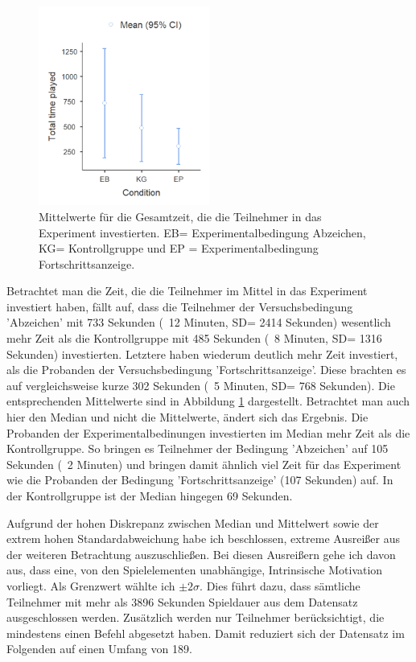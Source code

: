 \begin{figure}[htbp]
    \centering
    \includegraphics[width=0.5\textwidth]{img/auswertung/mean_time.png}
    \caption{Mittelwerte für die Gesamtzeit, die die Teilnehmer in das Experiment investierten. EB= Experimentalbedingung Abzeichen, KG= Kontrollgruppe und EP = Experimentalbedingung Fortschrittsanzeige.}
    \label{mean_time}
\end{figure}
Betrachtet man die Zeit, die die Teilnehmer im Mittel in das Experiment investiert haben, fällt auf, dass die Teilnehmer der Versuchsbedingung 'Abzeichen' mit 733 Sekunden (~12 Minuten, SD= 2414 Sekunden) wesentlich mehr Zeit als die Kontrollgruppe mit 485 Sekunden (~8 Minuten, SD= 1316 Sekunden) investierten. Letztere haben wiederum deutlich mehr Zeit investiert, als die Probanden der Versuchsbedingung 'Fortschrittsanzeige'. Diese brachten es auf vergleichsweise kurze 302 Sekunden (~5 Minuten, SD= 768 Sekunden). Die entsprechenden Mittelwerte sind in Abbildung \ref{mean_time} dargestellt. Betrachtet man auch hier den Median und nicht die Mittelwerte, ändert sich das Ergebnis. Die Probanden der Experimentalbedinungen investierten im Median mehr Zeit als die Kontrollgruppe. So bringen es Teilnehmer der Bedingung 'Abzeichen' auf 105 Sekunden (~2 Minuten) und bringen damit ähnlich viel Zeit für das Experiment wie die Probanden der Bedingung 'Fortschrittsanzeige' (107 Sekunden) auf. In der Kontrollgruppe ist der Median hingegen 69 Sekunden.

Aufgrund der hohen Diskrepanz zwischen Median und Mittelwert sowie der extrem hohen Standardabweichung habe ich beschlossen, extreme Ausreißer aus der weiteren Betrachtung auszuschließen. Bei diesen Ausreißern gehe ich davon aus, dass eine, von den Spielelementen unabhängige, Intrinsische Motivation vorliegt. Als Grenzwert wählte ich $\pm 2\sigma$. Dies führt dazu, dass sämtliche Teilnehmer mit mehr als 3896 Sekunden Spieldauer aus dem Datensatz ausgeschlossen werden. Zusätzlich werden nur Teilnehmer berücksichtigt, die mindestens einen Befehl abgesetzt haben. Damit reduziert sich der Datensatz im Folgenden auf einen Umfang von 189.

